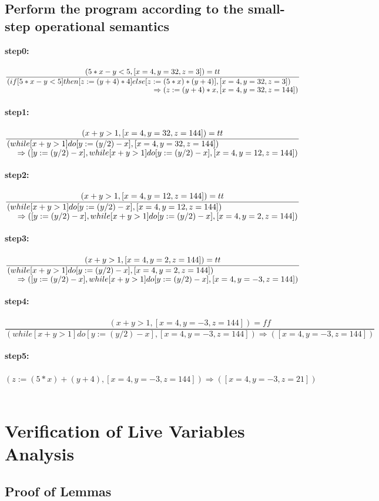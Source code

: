 \documentclass[a4paper, 12pt]{article}
\begin{document}
\subsection{Perform the program according to the small-step operational semantics}
\textbf{step0:}\\
\\
$\dfrac{(5*x-y<5,[x=4,y=32,z=3])=tt}{\splitfrac{(if[5*x-y<5]then[z:=(y+4)*4]else[z:=(5*x)*(y+4)], [x=4,y=32,z=3])}{\Rightarrow(z:=(y+4)*x,[x=4,y=32,z=144])}}$
\\
\\
\textbf{step1:}\\
\\
$\dfrac{(x+y>1,[x=4,y=32,z=144])=tt}{\splitfrac{(while[x+y>1]do[y:=(y/2)-x],[x=4,y=32,z=144])}{\Rightarrow([y:=(y/2)-x],while[x+y>1]do[y:=(y/2)-x],[x=4,y=12,z=144])}}$
\\
\\
\textbf{step2:}\\
\\
$\dfrac{(x+y>1,[x=4,y=12,z=144])=tt}{\splitfrac{(while[x+y>1]do[y:=(y/2)-x],[x=4,y=12,z=144])}{\Rightarrow([y:=(y/2)-x],while[x+y>1]do[y:=(y/2)-x],[x=4,y=2,z=144])}}$
\\
\\
\textbf{step3:}\\
\\
$\dfrac{(x+y>1,[x=4,y=2,z=144])=tt}{\splitfrac{(while[x+y>1]do[y:=(y/2)-x],[x=4,y=2,z=144])}{\Rightarrow([y:=(y/2)-x],while[x+y>1]do[y:=(y/2)-x],[x=4,y=-3,z=144])}}$
\\
\\
\textbf{step4:}\\
\\
$\dfrac{(x+y>1,[x=4,y=-3,z=144])=ff}{(while[x+y>1]do[y:=(y/2)-x],[x=4,y=-3,z=144])\Rightarrow([x=4,y=-3,z=144])}$
\\
\\
\textbf{step5:}\\
\\
${(z:=(5*x)+(y+4),[x=4,y=-3,z=144])\Rightarrow([x=4,y=-3,z=21])}$
\\
\\

\section{Verification of Live Variables Analysis}
\subsection{Proof of Lemmas}
\end{document}
